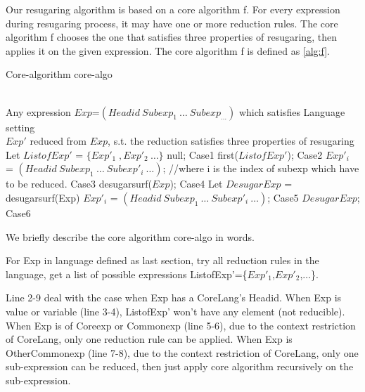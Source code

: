 Our resugaring algorithm is based on a core algorithm f. For every expression during resugaring process, it may have one or more reduction rules. The core algorithm f chooses the one that satisfies three properties of resugaring, then applies it on the given expression. The core algorithm f is defined as \ref{alg:f}.
\begin{algorithm}
	\caption{Core-algorithm core-algo}
	\label{alg:f}     %
	\begin{algorithmic}[1]       %
		\REQUIRE ~~\\      %
		Any expression $Exp$=$(Headid~Subexp_{1}~\ldots~Subexp_{\ldots})$ which satisfies Language setting
		\ENSURE ~~\\     %
		$Exp'$ reduced from $Exp$, s.t. the reduction satisfies three properties of resugaring
		\STATE     Let $ListofExp'$ = $\{Exp'_{1}\;,Exp'_{2}~\ldots\}$
		\RETURN null; \hfill Case1
		\RETURN first($ListofExp'$); \hfill Case2
		\ELSE
		\RETURN $Exp'_{i}$ = $(Headid~Subexp_{1}~\ldots~Subexp'_{i}~\ldots)$; //where i is the index of subexp which have to be reduced. \hfill Case3
		\ENDIF
		\ELSE
		\RETURN desugarsurf($Exp$); \hfill Case4
		\ELSE
		\STATE Let $DesugarExp$ = desugarsurf(Exp)
		\RETURN $Exp'_{i}$ = $(Headid~Subexp_{1}~\ldots~Subexp'_{i}~\ldots)$; \hfill Case5
		\ELSE
		\RETURN $DesugarExp$; \hfill Case6
		\ENDIF
		\ENDIF
		\ENDIF

	\end{algorithmic}
\end{algorithm}

We briefly describe the core algorithm core-algo in words.

For Exp in language defined as last section, try all reduction rules in the language, get a list of possible expressions ListofExp'=\{$Exp'_{1}$,$Exp'_{2}$,$\ldots$\}.

Line 2-9 deal with the case when Exp has a CoreLang's Headid. When Exp is value or variable (line 3-4), ListofExp' won't have any element (not reducible). When Exp is of Coreexp or Commonexp (line 5-6), due to the context restriction of CoreLang, only one reduction rule can be applied. When Exp is OtherCommonexp (line 7-8), due to the context restriction of CoreLang, only one sub-expression can be reduced, then just apply core algorithm recursively on the sub-expression.

